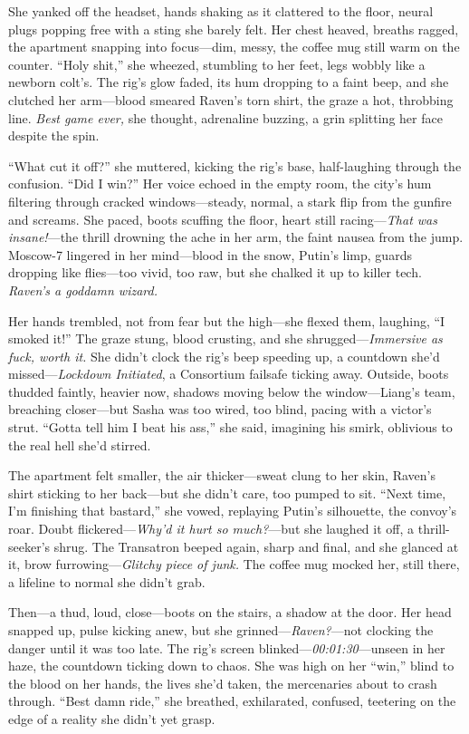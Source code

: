 \documentclass[12pt]{book}
\begin{document}
She yanked off the headset, hands shaking as it clattered to the floor, neural plugs popping free with a sting she barely felt. Her chest heaved, breaths ragged, the apartment snapping into focus—dim, messy, the coffee mug still warm on the counter. “Holy shit,” she wheezed, stumbling to her feet, legs wobbly like a newborn colt’s. The rig’s glow faded, its hum dropping to a faint beep, and she clutched her arm—blood smeared Raven’s torn shirt, the graze a hot, throbbing line. \textit{Best game ever,} she thought, adrenaline buzzing, a grin splitting her face despite the spin.

“What cut it off?” she muttered, kicking the rig’s base, half-laughing through the confusion. “Did I win?” Her voice echoed in the empty room, the city’s hum filtering through cracked windows—steady, normal, a stark flip from the gunfire and screams. She paced, boots scuffing the floor, heart still racing—\textit{That was insane!}—the thrill drowning the ache in her arm, the faint nausea from the jump. Moscow-7 lingered in her mind—blood in the snow, Putin’s limp, guards dropping like flies—too vivid, too raw, but she chalked it up to killer tech. \textit{Raven’s a goddamn wizard.}

Her hands trembled, not from fear but the high—she flexed them, laughing, “I smoked it!” The graze stung, blood crusting, and she shrugged—\textit{Immersive as fuck, worth it.} She didn’t clock the rig’s beep speeding up, a countdown she’d missed—\textit{Lockdown Initiated}, a Consortium failsafe ticking away. Outside, boots thudded faintly, heavier now, shadows moving below the window—Liang’s team, breaching closer—but Sasha was too wired, too blind, pacing with a victor’s strut. “Gotta tell him I beat his ass,” she said, imagining his smirk, oblivious to the real hell she’d stirred.

The apartment felt smaller, the air thicker—sweat clung to her skin, Raven’s shirt sticking to her back—but she didn’t care, too pumped to sit. “Next time, I’m finishing that bastard,” she vowed, replaying Putin’s silhouette, the convoy’s roar. Doubt flickered—\textit{Why’d it hurt so much?}—but she laughed it off, a thrill-seeker’s shrug. The Transatron beeped again, sharp and final, and she glanced at it, brow furrowing—\textit{Glitchy piece of junk.} The coffee mug mocked her, still there, a lifeline to normal she didn’t grab.

Then—a thud, loud, close—boots on the stairs, a shadow at the door. Her head snapped up, pulse kicking anew, but she grinned—\textit{Raven?}—not clocking the danger until it was too late. The rig’s screen blinked—\textit{00:01:30}—unseen in her haze, the countdown ticking down to chaos. She was high on her “win,” blind to the blood on her hands, the lives she’d taken, the mercenaries about to crash through. “Best damn ride,” she breathed, exhilarated, confused, teetering on the edge of a reality she didn’t yet grasp.
\end{document}
